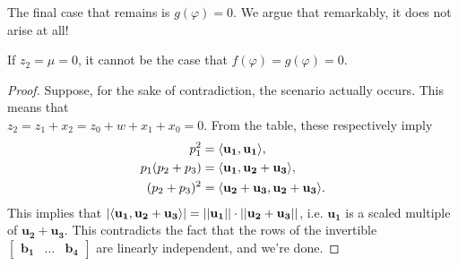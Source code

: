 The final case that remains is $g(\varphi) = 0$. We argue that remarkably, it does not arise at all!
\begin{lemma}
If $z_2 = \mu=0$, it cannot be the case that $f(\varphi) = g(\varphi) = 0$.
\end{lemma}
\begin{proof}
Suppose, for the sake of contradiction, the scenario actually occurs. This means that \\
$
z_2 = z_1 + x_2 = z_0 + w + x_1 + x_0 = 0.
$
From the table, these respectively imply
\begin{align*}
p_1^2 &= \langle\mathbf{u_1}, \mathbf{u_1}\rangle, \\
p_1(p_2 + p_3) &= \langle\mathbf{u_1}, \mathbf{u_2} + \mathbf{u_3}\rangle, \\
(p_2 + p_3)^2 &= \langle\mathbf{u_2} + \mathbf{u_3}, \mathbf{u_2} + \mathbf{u_3}\rangle.
\end{align*}
This implies that $|\langle\mathbf{u_1}, \mathbf{u_2} + \mathbf{u_3}\rangle| = ||\mathbf{u_1}||\cdot||\mathbf{u_2} + \mathbf{u_3}||$, i.e. $\mathbf{u_1}$ is a scaled multiple of $\mathbf{u_2} + \mathbf{u_3}$. This contradicts the fact that the rows of the invertible $\begin{bmatrix} \mathbf{b_1}& \dots & \mathbf{b_4}\end{bmatrix}$ are linearly independent, and we're done.
\end{proof}


